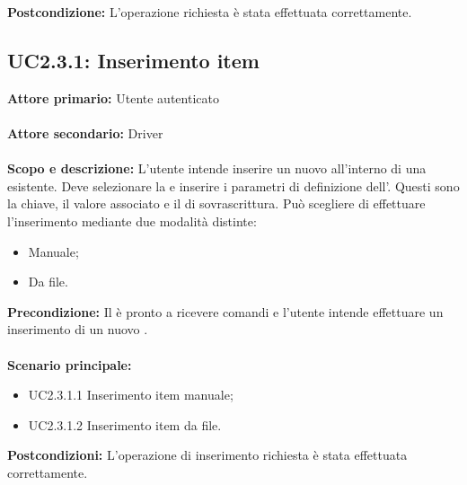 \documentclass{scalatekids-article}
\begin{document}
\textbf{Postcondizione:} L'operazione richiesta è stata effettuata correttamente.

\subsection{UC2.3.1: Inserimento item}

\textbf{Attore primario:} Utente autenticato\\ \\
\textbf{Attore secondario:} Driver\\ \\
\textbf{Scopo e descrizione:} L'utente intende inserire un nuovo  all'interno di una  esistente. Deve selezionare la  e inserire i parametri di definizione dell'. Questi sono la chiave, il valore associato e il  di sovrascrittura. Può scegliere di effettuare l'inserimento mediante due modalità distinte:
\begin{itemize}
  \item Manuale;
  \item Da file.
\end{itemize}
\textbf{Precondizione:} Il  è pronto a ricevere comandi e l'utente intende effettuare un inserimento di un nuovo .\\ \\
\textbf{Scenario principale:}
\begin{itemize}
  \item UC2.3.1.1 Inserimento item manuale;
  \item UC2.3.1.2 Inserimento item da file.
\end{itemize}
\textbf{Postcondizioni:} L'operazione di inserimento richiesta è stata effettuata correttamente.
\end{document}
